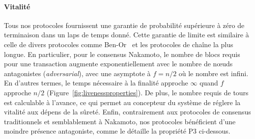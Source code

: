 \documentclass[letterpaper,twocolumn,10pt]{article}
\newcommand{\tronly}[2]{#1}
\theoremstyle{definition}
\begin{document}
\paragraph{Vitalité} Tous nos protocoles fournissent une garantie de probabilité supérieure à zéro de terminaison dans un laps de temps donné.
Cette garantie de limite est similaire à celle de divers protocoles comme Ben-Or~\cite{ben1983another} et les protocoles de chaîne la plus longue.
En particulier, pour le consensus Nakamoto, le nombre de blocs requis pour une transaction augmente exponentiellement avec le nombre de nœuds antagonistes (\emph{adversarial}), avec une asymptote à $f = n/2$ où le nombre est infini. %
En d'autres termes, le temps nécessaire à la finalité approche $\infty$ quand $f$ approche $n/2$\tronly{ (Figure~\ref{fig:livenessproperties}).}{.}
De plus, le nombre requis de tours est calculable à l'avance, ce qui permet au concepteur du système de réglere la vitalité aux dépens de la sûreté. Enfin, contrairement aux protocoles de consensus traditionnels et semblablement à Nakamoto, nos protocoles bénéficient d'une moindre présence antagoniste, comme le détaille la propriété P3 ci-dessous.
\end{document}
